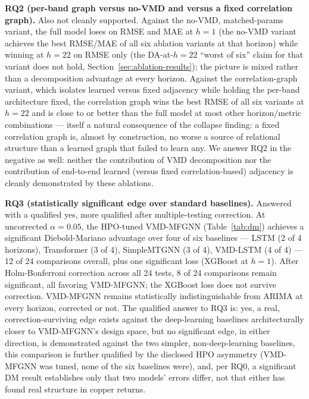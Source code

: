 \documentclass[journal]{IEEEtran}
\begin{document}
\textbf{RQ2 (per-band graph versus no-VMD and versus a fixed correlation graph).} Also not cleanly supported. Against the no-VMD, matched-params variant, the full model loses on RMSE and MAE at $h=1$ (the no-VMD variant achieves the best RMSE/MAE of all six ablation variants at that horizon) while winning at $h=22$ on RMSE only (the DA-at-$h=22$ ``worst of six'' claim for that variant does not hold, Section~\ref{sec:ablation-results}); the picture is mixed rather than a decomposition advantage at every horizon. Against the correlation-graph variant, which isolates learned versus fixed adjacency while holding the per-band architecture fixed, the correlation graph wins the best RMSE of all six variants at $h=22$ and is close to or better than the full model at most other horizon/metric combinations --- itself a natural consequence of the collapse finding: a fixed correlation graph is, almost by construction, no worse a source of relational structure than a learned graph that failed to learn any. We answer RQ2 in the negative as well: neither the contribution of VMD decomposition nor the contribution of end-to-end learned (versus fixed correlation-based) adjacency is cleanly demonstrated by these ablations.

\textbf{RQ3 (statistically significant edge over standard baselines).} Answered with a qualified yes, more qualified after multiple-testing correction. At uncorrected $\alpha=0.05$, the HPO-tuned VMD-MFGNN (Table~\ref{tab:dm}) achieves a significant Diebold-Mariano advantage over four of six baselines --- LSTM (2 of 4 horizons), Transformer (3 of 4), SimpleMTGNN (3 of 4), VMD-LSTM (4 of 4) --- 12 of 24 comparisons overall, plus one significant loss (XGBoost at $h=1$). After Holm-Bonferroni correction across all 24 tests, 8 of 24 comparisons remain significant, all favoring VMD-MFGNN; the XGBoost loss does not survive correction. VMD-MFGNN remains statistically indistinguishable from ARIMA at every horizon, corrected or not. The qualified answer to RQ3 is: yes, a real, correction-surviving edge exists against the deep-learning baselines architecturally closer to VMD-MFGNN's design space, but no significant edge, in either direction, is demonstrated against the two simpler, non-deep-learning baselines, this comparison is further qualified by the disclosed HPO asymmetry (VMD-MFGNN was tuned, none of the six baselines were), and, per RQ0, a significant DM result establishes only that two models' errors differ, not that either has found real structure in copper returns.
\end{document}
